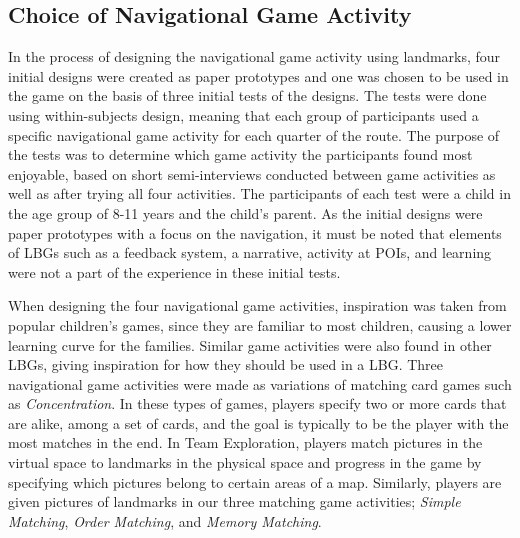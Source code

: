 \subsection{Choice of Navigational Game Activity}
In the process of designing the navigational game activity using landmarks, four initial designs were created as paper prototypes and one was chosen to be used in the game on the basis of three initial tests of the designs. The tests were done using within-subjects design, meaning that each group of participants used a specific navigational game activity for each quarter of the route. The purpose of the tests was to determine which game activity the participants found most enjoyable, based on short semi-interviews conducted between game activities as well as after trying all four activities. The participants of each test were a child in the age group of 8-11 years and the child's parent. As the initial designs were paper prototypes with a focus on the navigation, it must be noted that elements of LBGs such as a feedback system, a narrative, activity at POIs, and learning were not a part of the experience in these initial tests.

When designing the four navigational game activities, inspiration was taken from popular children's games, since they are familiar to most children, causing a lower learning curve for the families. Similar game activities were also found in other LBGs, giving inspiration for how they should be used in a LBG. Three navigational game activities were made as variations of matching card games such as \textit{Concentration}\cite{childrensGames}. In these types of games, players specify two or more cards that are alike, among a set of cards, and the goal is typically to be the player with the most matches in the end. In Team Exploration\cite{GamingOnTheMove}, players match pictures in the virtual space to landmarks in the physical space and progress in the game by specifying which pictures belong to certain areas of a map. Similarly, players are given pictures of landmarks in our three matching game activities; \textit{Simple Matching}, \textit{Order Matching}, and \textit{Memory Matching}.

